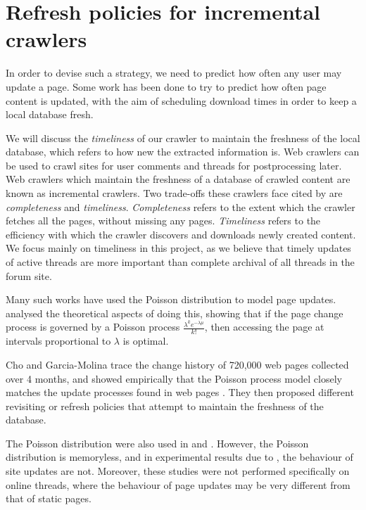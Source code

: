 \section{Refresh policies for incremental crawlers}
In order to devise such a strategy, we need to predict how often any user may 
update a page. Some work has been done to try to predict how often page content 
is updated, with the aim of scheduling download times in order to keep a local 
database fresh.


We will discuss the \emph{timeliness} of our crawler to maintain the freshness 
of the local database, which refers to how new the extracted information is. Web 
crawlers can be used to crawl sites for user comments and threads for 
postprocessing later. Web crawlers which maintain the freshness of a database of 
crawled content are known as incremental crawlers. Two trade-offs these crawlers 
face cited by  are \emph{completeness} and \emph{timeliness}.  
\emph{Completeness} refers to the extent which the crawler fetches all the 
pages, without missing any pages. \emph{Timeliness} refers to the efficiency 
with which the crawler discovers and downloads newly created content. We focus 
mainly on timeliness in this project, as we believe that timely updates of 
active threads are more important than complete archival of all threads in the 
forum site.

Many such works have used the Poisson distribution to model page updates.  
 analysed the theoretical aspects of doing this, showing 
that if the page change process is governed by a Poisson process 
$\frac{\lambda^k e^{-\lambda \mu}}{k!}$, then accessing the page at intervals 
proportional to $\lambda$ is optimal.

Cho and Garcia-Molina trace the change history of 720,000 web pages collected 
over 4 months, and showed empirically that the Poisson process model closely 
matches the update processes found in web pages \cite{Cho1999}. They then 
proposed different revisiting or refresh policies 
\cite{Cho2003,Garcia-molina2003} that attempt to maintain the freshness of the 
database.

The Poisson distribution were also used in  and 
. %
However, the Poisson distribution is memoryless, and in experimental results due 
to , the behaviour of site updates are not. Moreover, these 
studies were not performed specifically on online threads, where the behaviour 
of page updates may be very different from that of static pages.

